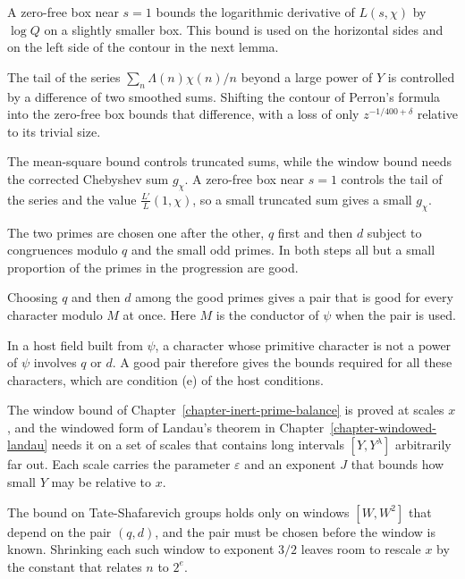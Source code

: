 A zero-free box near $s=1$ bounds the logarithmic derivative of $L(s,\chi)$ by $\log Q$ on a
slightly smaller box. This bound is used on the horizontal sides and on the left side of the contour
in the next lemma.

The tail of the series $\sum_n\Lambda(n)\chi(n)/n$ beyond a large power of $Y$ is controlled by a
difference of two smoothed sums. Shifting the contour of Perron's formula into the zero-free box
bounds that difference, with a loss of only $z^{-1/400+\delta}$ relative to its trivial size.

The mean-square bound controls truncated sums, while the window bound needs the corrected Chebyshev
sum $g_\chi$. A zero-free box near $s=1$ controls the tail of the series and the value
$\frac{L'}{L}(1,\chi)$, so a small truncated sum gives a small $g_\chi$.

The two primes are chosen one after the other, $q$ first and then $d$ subject to congruences
modulo $q$ and the small odd primes. In both steps all but a small proportion of the primes in the
progression are good.

Choosing $q$ and then $d$ among the good primes gives a pair that is good for every character
modulo $M$ at once. Here $M$ is the conductor of $\psi$ when the pair is used.

In a host field built from $\psi$, a character whose primitive character is not a power of $\psi$
involves $q$ or $d$. A good pair therefore gives the bounds required for all these characters,
which are condition (e) of the host conditions.

The window bound of Chapter~\ref{chapter-inert-prime-balance} is proved at scales $x$, and the
windowed form of Landau's theorem in Chapter~\ref{chapter-windowed-landau} needs it on a set of
scales that contains long intervals $[Y,Y^\lambda]$ arbitrarily far out. Each scale carries the
parameter $\varepsilon$ and an exponent $J$ that bounds how small $Y$ may be relative to $x$.

The bound on Tate-Shafarevich groups holds only on windows $[W,W^2]$ that depend on the pair
$(q,d)$, and the pair must be chosen before the window is known. Shrinking each such window to
exponent $3/2$ leaves room to rescale $x$ by the constant that relates $n$ to $2^e$.

